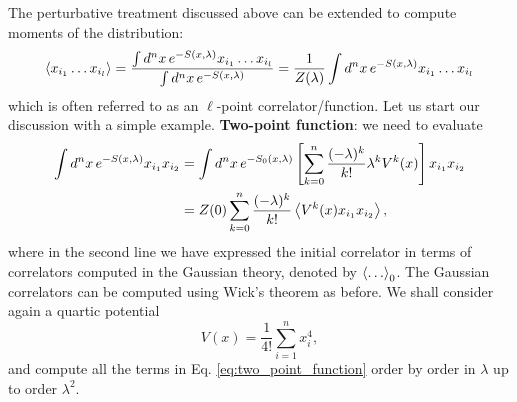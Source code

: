 \documentclass{article}
\numberwithin{equation}{section}
\begin{document}
The perturbative treatment discussed above can be extended to compute moments of the distribution:
\begin{equation} \label{eq:twopoint_correlator}
    \ev{x_{i_1} \dots x_{i_l}} = \frac{\int d^nx \, e^{-S(x,\lambda)} x_{i_1} \dots x_{i_l}}{\int d^nx\, e^{-S(x,\lambda)}} = \frac{1}{Z(\lambda)} \int d^nx\, e^{-S(x,\lambda)} x_{i_1} \dots x_{i_l}
\end{equation}
which is often referred to as an $\ell$-point correlator/function. Let us start our discussion with a simple example. 
\textbf{Two-point function}: we need to evaluate
\begin{equation}
\begin{aligned} \label{eq:two_point_function}
    \int d^nx \, e^{-S(x, \lambda)} x_{i_1} x_{i_2} &= \int d^nx \, e^{-S_0(x, \lambda)} \left[\sum_{k=0}^n \frac{(-\lambda)^k}{k!} \lambda^k V^k(x)\right] x_{i_1} x_{i_2} \\
    &= Z(0) \sum_{k=0}^n \frac{(-\lambda)^k}{k!} \ev{V^k(x) x_{i_1} x_{i_2}},
\end{aligned}
\end{equation}
where in the second line we have expressed the initial correlator in terms of correlators computed in the Gaussian theory, denoted by $\ev{\dots}_0$. The Gaussian correlators can be computed using Wick's theorem as before. We shall consider again a quartic potential
\begin{equation}
    V(x) = \frac{1}{4!} \sum_{i=1}^n x_i^4,
\end{equation}
and compute all the terms in Eq. \ref{eq:two_point_function} order by order in $\lambda$ up to order $\lambda^2$.
\end{document}
